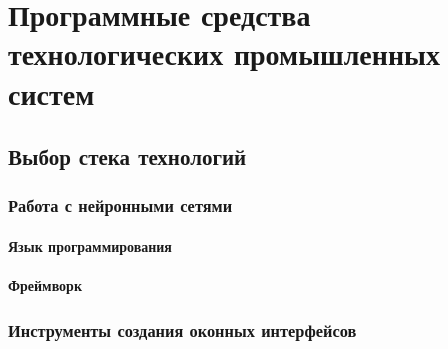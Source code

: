 \chapter{Программные средства технологических промышленных систем}

\section{Выбор стека технологий}

\subsection{Работа с нейронными сетями}

\subsubsection{Язык программирования}

\subsubsection{Фреймворк}

\subsection{Инструменты создания оконных интерфейсов}
